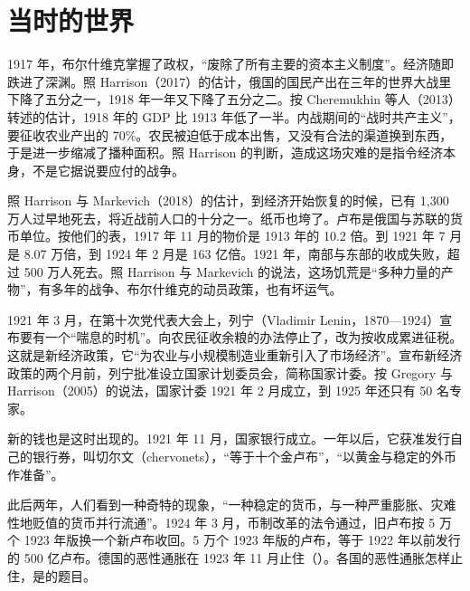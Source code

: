 \section{当时的世界}\label{sec:soviet-world}

1917 年，布尔什维克掌握了政权，“废除了所有主要的资本主义制度”\cite{cggt2013}。经济随即跌进了深渊。照 Harrison（2017）的估计，俄国的国民产出在三年的世界大战里下降了五分之一，1918 年一年又下降了五分之二\cite{harrison2017}。按 Cheremukhin 等人（2013）转述的估计，1918 年的 GDP 比 1913 年低了一半\cite{cggt2013}。内战期间的“战时共产主义”，要征收农业产出的 70\%\cite{cggt2013}。农民被迫低于成本出售，又没有合法的渠道换到东西，于是进一步缩减了播种面积\cite{harrison2017}。照 Harrison 的判断，造成这场灾难的是指令经济本身，不是它据说要应付的战争\cite{harrison2017}。

照 Harrison 与 Markevich（2018）的估计，到经济开始恢复的时候，已有 1,300 万人过早地死去，将近战前人口的十分之一\cite{harrison2018}。纸币也垮了。卢布是俄国与苏联的货币单位。按他们的表，1917 年 11 月的物价是 1913 年的 10.2 倍\cite{harrison2018}。到 1921 年 7 月是 8.07 万倍，到 1924 年 2 月是 163 亿倍\cite{harrison2018}。1921 年，南部与东部的收成失败，超过 500 万人死去\cite{harrison2017}。照 Harrison 与 Markevich 的说法，这场饥荒是“多种力量的产物”，有多年的战争、布尔什维克的动员政策，也有坏运气\cite{harrison2018}。

1921 年 3 月，在第十次党代表大会上，列宁（Vladimir Lenin，1870—1924）宣布要有一个“喘息的时机”\cite{harrison2017,loc31}。向农民征收余粮的办法停止了，改为按收成累进征税\cite{harrison2017}。这就是新经济政策，它“为农业与小规模制造业重新引入了市场经济”\cite{mnq2021}。宣布新经济政策的两个月前，列宁批准设立国家计划委员会，简称国家计委\cite{harrison2017}。按 Gregory 与 Harrison（2005）的说法，国家计委 1921 年 2 月成立，到 1925 年还只有 50 名专家\cite{gregory2005}。

新的钱也是这时出现的。1921 年 11 月，国家银行成立。一年以后，它获准发行自己的银行券，叫切尔文（chervonets），“等于十个金卢布”，“以黄金与稳定的外币作准备”\cite{suib1929}。

此后两年，人们看到一种奇特的现象，“一种稳定的货币，与一种严重膨胀、灾难性地贬值的货币并行流通”\cite{suib1929}。1924 年 3 月，币制改革的法令通过，旧卢布按 5 万个 1923 年版换一个新卢布收回\cite{suib1929}。5 万个 1923 年版的卢布，等于 1922 年以前发行的 500 亿卢布\cite{suib1929}。德国的恶性通胀在 1923 年 11 月止住（）。各国的恶性通胀怎样止住，是的题目。

